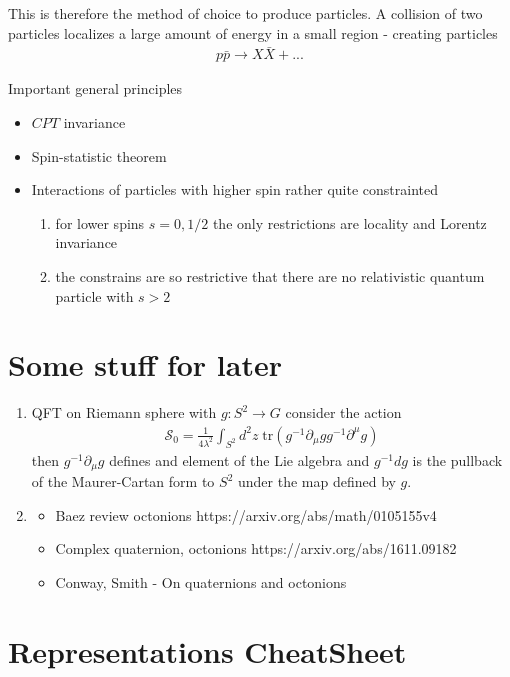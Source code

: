 \documentclass[10pt,a4paper]{article}
\theoremstyle{definition}
\begin{document}
This is therefore the method of choice to produce particles. A collision of two particles localizes a large amount of energy in a small region - creating particles
\begin{align}
    p\bar{p}\rightarrow X\bar{X}+ ...
\end{align}

Important general principles
\begin{itemize}
    \item $CPT$ invariance
    \item Spin-statistic theorem
    \item Interactions of particles with higher spin rather quite constrainted
    \begin{enumerate}
        \item for lower spins $s=0, 1/2$ the only restrictions are locality and Lorentz invariance
        \item the constrains are so restrictive that there are no relativistic quantum particle with $s>2$
    \end{enumerate}
\end{itemize}


\newpage 
\section{Some stuff for later}
\begin{enumerate}
    \item QFT on Riemann sphere with $g:S^2\rightarrow G$ consider the action 
    \begin{align}
        \mathcal{S}_0=\frac{1}{4\lambda^2}\int_{S^2}d^2z\;\text{tr}(g^{-1}\partial_\mu g g^{-1}\partial^\mu g)
    \end{align}
    then $g^{-1}\partial_\mu g$ defines and element of the Lie algebra and $g^{-1}dg$ is the pullback of the Maurer-Cartan form to $S^2$ under the map defined by $g$.
    \item 
    \begin{itemize}
        \item Baez review octonions {\sc https://arxiv.org/abs/math/0105155v4}
        \item Complex quaternion, octonions {\sc https://arxiv.org/abs/1611.09182}
        \item Conway, Smith - On quaternions and octonions
    \end{itemize}
\end{enumerate}


\newpage
\section{Representations CheatSheet}
\end{document}
